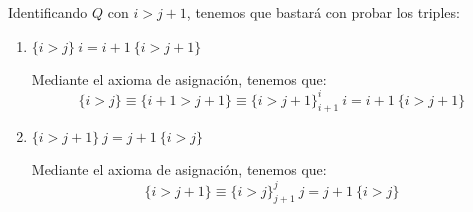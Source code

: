 \begin{ejercicio}
\begin{enumerate}
            Identificando $Q$ con $i>j+1$, tenemos que bastará con probar los triples:
            \begin{enumerate}
                \item $\{i>j\}\ i=i+1\ \{i>j+1\}$
                
                Mediante el axioma de asignación, tenemos que:
                \begin{equation*}
                    \{i>j\} \equiv \{i+1>j+1\} \equiv \{i>j+1\}^i_{i+1}\ i=i+1\ \{i>j+1\}
                \end{equation*}

                \item $\{i>j+1\}\ j=j+1\ \{i>j\}$
                
                Mediante el axioma de asignación, tenemos que:
                \begin{equation*}
                    \{i>j+1\} \equiv \{i>j\}^j_{j+1}\ j=j+1\ \{i>j\}
                \end{equation*}
            \end{enumerate}


\end{enumerate}
\end{ejercicio}
